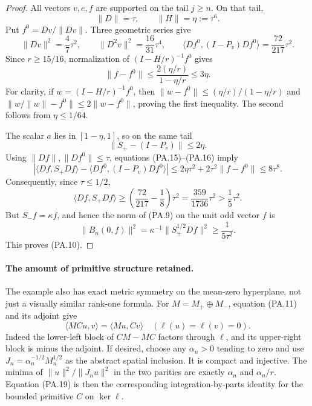 \begin{proof}
All vectors \(v,e,f\) are supported on the tail \(j\ge n\).
On that tail,
\[
       \|D\|=\tau,\qquad \|H\|=\eta:=\tau^6.
 \tag{PA.13}
\]
Put \(f^0=Dv/\|Dv\|\).  Three geometric series give
\[
 \|Dv\|^2=\frac47\tau^2,
 \qquad \|D^2v\|^2=\frac{16}{31}\tau^4,
 \qquad
 \langle Df^0,(I-P_v)Df^0\rangle
       =\frac{72}{217}\tau^2.
 \tag{PA.14}
\]
Since \(r\ge15/16\), normalization of
\((I-H/r)^{-1}f^0\) gives
\[
 \|f-f^0\|\le\frac{2(\eta/r)}{1-\eta/r}
                 \le3\eta .
 \tag{PA.15}
\]
For clarity, if \(w=(I-H/r)^{-1}f^0\), then
\(\|w-f^0\|\le(\eta/r)/(1-\eta/r)\) and
\(\|w/\|w\|-f^0\|\le2\|w-f^0\|\), proving the first
inequality.  The second follows from \(\eta\le1/64\).

The scalar \(a\) lies in \([1-\eta,1]\), so on the same tail
\[
       \|S_+-(I-P_v)\|\le2\eta.
 \tag{PA.16}
\]
Using \(\|Df\|,\|Df^0\|\le\tau\), equations
(PA.15)--(PA.16) imply
\[
 \left|\langle Df,S_+Df\rangle
       -\langle Df^0,(I-P_v)Df^0\rangle\right|
       \le 2\eta\tau^2+2\tau^2\|f-f^0\|
       \le8\tau^8.
 \tag{PA.17}
\]
Consequently, since \(\tau\le1/2\),
\[
 \langle Df,S_+Df\rangle
 \ge\left(\frac{72}{217}-\frac18\right)\tau^2
 =\frac{359}{1736}\tau^2
 >\frac15\tau^2.
 \tag{PA.18}
\]
But \(S_-f=\kappa f\), and hence the norm of (PA.9) on the
unit odd vector \(f\) is
\[
 \|B_n(0,f)\|^2
   =\kappa^{-1}\|S_+^{1/2}Df\|^2
   \ge\frac1{5\tau^2}.
\]
This proves (PA.10).
\end{proof}

\paragraph{The amount of primitive structure retained.}
The example also has exact metric symmetry on the mean-zero
hyperplane, not just a visually similar rank-one formula.
For \(M=M_+\oplus M_-\), equation (PA.11) and its adjoint give
\[
 \langle MC u,v\rangle=\langle M u,Cv\rangle
       \quad (\ell(u)=\ell(v)=0).
 \tag{PA.19}
\]
Indeed the lower-left block of \(CM-MC\) factors through
\(\ell\), and its upper-right block is minus the adjoint.
If desired, choose any \(\alpha_n>0\) tending to zero and use
\(J_n=\alpha_n^{-1/2}M_n^{1/2}\) as the abstract spatial
inclusion.  It is compact and injective.  The minima of
\(\|u\|^2/\|J_nu\|^2\) in the two parities are exactly
\(\alpha_n\) and \(\alpha_n/r\).  Equation (PA.19) is then the
corresponding integration-by-parts identity for the bounded
primitive \(C\) on \(\ker\ell\).

